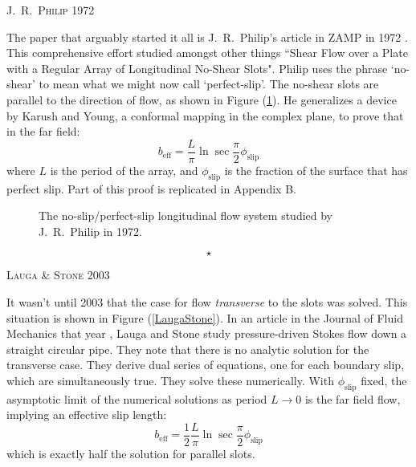 \documentclass[12pt, a4paper, twoside, openright]{book}
\newcommand{\beff}{\ensuremath{b_{\mathrm{eff}}}}
\newcommand{\phislip}{\ensuremath{\phi_{\mathrm{slip}}}}
\newcommand{\sep}{\begin{equation*} \star \end{equation*}}
\newcommand{\paper}[1]
         {\colorbox[gray]{0.8}{ \textsc{#1}}
         
         }
\begin{document}
\paper{J.\ R.\ Philip 1972}
The paper that arguably started it all is J.\ R.\ Philip's article in ZAMP in 1972 \cite{Philip1972}.  This comprehensive effort studied amongst other things ``Shear Flow over a Plate with a Regular Array of Longitudinal No-Shear Slots".  Philip uses the phrase `no-shear' to mean what we might now call `perfect-slip'.  The no-shear slots are parallel to the direction of flow, as shown in Figure (\ref{JRPhilip}).   He generalizes a device by Karush and Young, a conformal mapping in the complex plane, to prove that in the far field:
\begin{equation}
\beff= \frac{L}{\pi}	\ln \sec \frac{\pi}{2} \phislip
\end{equation}
where $L$ is the period of the array, and $\phislip$ is the fraction of the surface that has perfect slip. Part of this proof is replicated in Appendix B. 

\begin{figure}[ht]
\centering
{}
\caption{The no-slip/perfect-slip longitudinal flow system studied by J.~R.~Philip
in 1972.} \label{JRPhilip}
\end{figure}

\sep
\clearpage

\paper{Lauga \& Stone 2003}
It wasn't until 2003 that the case for flow \emph{transverse} to the slots was solved.  
This situation is shown in Figure (\ref{LaugaStone}).
In an article in the Journal of Fluid Mechanics that year \cite{LaugaStone2003}, Lauga and Stone study pressure-driven Stokes flow down a straight circular pipe.  They note that there is no analytic solution for the transverse case.  They derive dual series of equations, one for each boundary slip, which are simultaneously true.  They solve these numerically.  With $\phislip$ fixed, the asymptotic limit of the numerical solutions as period $L \rightarrow 0$ is the far field flow, implying an effective slip length:
\begin{equation}
\beff= \frac{1}{2} \frac{L}{\pi}	\ln \sec \frac{\pi}{2} \phislip
\end{equation}
which is exactly half the solution for parallel slots.
\end{document}
